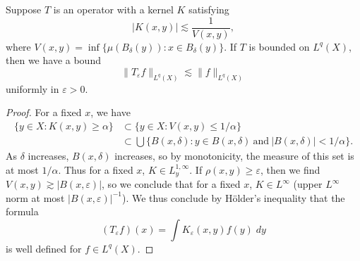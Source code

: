 \begin{theorem}
    Suppose $T$ is an operator with a kernel $K$ satisfying
    \[ |K(x,y)| \lesssim \frac{1}{V(x,y)}, \]
    where $V(x,y) = \inf \{ \mu(B_\delta(y)) : x \in B_\delta(y) \}$. If $T$ is bounded on $L^q(X)$, then we have a bound
    \[ \| T_\varepsilon f \|_{L^q(X)} \lesssim \| f \|_{L^q(X)} \]
    uniformly in $\varepsilon > 0$.
\end{theorem}
\begin{proof}
    For a fixed $x$, we have
    \begin{align*}
        \{ y \in X: K(x,y) \geq \alpha \} &\subset \{ y \in X: V(x,y) \leq 1/\alpha \}\\
        &\subset \bigcup \{ B(x,\delta): y \in B(x,\delta)\ \text{and}\ |B(x,\delta)| < 1/\alpha \}.
    \end{align*}
    As $\delta$ increases, $B(x,\delta)$ increases, so by monotonicity, the measure of this set is at most $1/\alpha$. Thus for a fixed $x$, $K \in L^{1,\infty}_y$. If $\rho(x,y) \geq \varepsilon$, then we find $V(x,y) \gtrsim |B(x,\varepsilon)|$, so we conclude that for a fixed $x$, $K \in L^\infty$ (upper $L^\infty$ norm at most $|B(x,\varepsilon)|^{-1}$). We thus conclude by H\"{o}lder's inequality that the formula
    \[ (T_\varepsilon f)(x) = \int K_\varepsilon(x,y) f(y)\; dy \]
    is well defined for $f \in L^q(X)$.


\end{proof}
